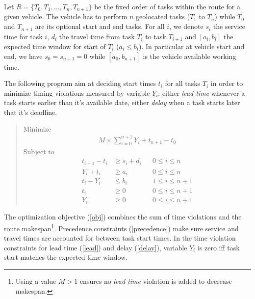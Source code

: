 \documentclass{article}
\begin{document}
Let $R=\{T_0, T_1, \ldots, T_n, T_{n + 1}\}$ be the fixed order of
tasks within the route for a given vehicle. The vehicle has to perform
$n$ geolocated tasks ($T_1$ to $T_n$) while $T_0$ and $T_{n + 1}$ are
its optional start and end tasks. For all $i$, we denote $s_i$ the
service time for task $i$, $d_i$ the travel time from task $T_i$ to
task $T_{i + 1}$ and $[a_i, b_i]$ the expected time window for start
of $T_i$ ($a_i \leq b_i$). In particular at vehicle start and end, we
have $s_0 = s_{n + 1} = 0$ while $[a_0, b_{n + 1}]$ is the vehicle
available working time.

The following program aim at deciding start times $t_i$ for all tasks
$T_i$ in order to minimize timing violations measured by variable
$Y_i$: either \textit{lead time} whenever a task starts earlier than
it's available date, either \textit{delay} when a task starts later
that it's deadline.


\begin{quote}
  Minimize
  \begin{align}
    M \times \sum_{i = 0}^{n + 1} Y_i + t_{n +1} - t_0 \label{obj}\tag{Obj}
  \end{align}
  Subject to
  \begin{align}
    t_{i + 1} - t_i &\geq s_i + d_i && 0 \leq i \leq n\label{precedence}\tag{$P_i$}\\
    Y_i + t_i &\geq a_i && 0 \leq i \leq n \label{lead}\tag{$L_i$}\\
    t_i - Y_i &\leq b_i && 1 \leq i \leq n + 1 \label{delay}\tag{$D_i$}\\
    t_i &\geq 0 && 0 \leq i \leq n + 1 \nonumber\\
    Y_i &\geq 0 && 0 \leq i \leq n + 1 \nonumber
  \end{align}
\end{quote}

The optimization objective (\ref{obj}) combines the sum of time
violations and the route makespan\footnote{Using a value $M > 1$
  ensures no \textit{lead time} violation is added to decrease
  makespan.}. Precedence constraints (\ref{precedence}) make sure
service and travel times are accounted for between task start
times. In the time violation constraints for lead time (\ref{lead})
and delay (\ref{delay}), variable $Y_i$ is zero iff task start matches
the expected time window.
\end{document}
